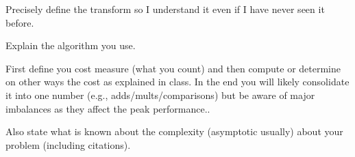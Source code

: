 Precisely define the transform so I understand it even if I have never
seen it before.

Explain the algorithm you use.

First define you cost measure (what you count) and then compute or determine on other ways the
cost as explained in class. In the end you will likely consolidate it into one number (e.g., adds/mults/comparisons) but be aware of major imbalances as they affect the peak performance..

Also state what is known about the complexity (asymptotic usually)
about your problem (including citations).